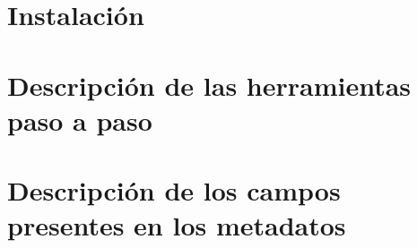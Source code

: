 \documentclass{GVT_CONAE_Class}
\begin{document}
\section{Instalación} %



\section{Descripción de las herramientas paso a paso}







\newpage %
\appendix


\section{Descripción de los campos presentes en los metadatos} \label{AP:descrcampos}
\end{document}
